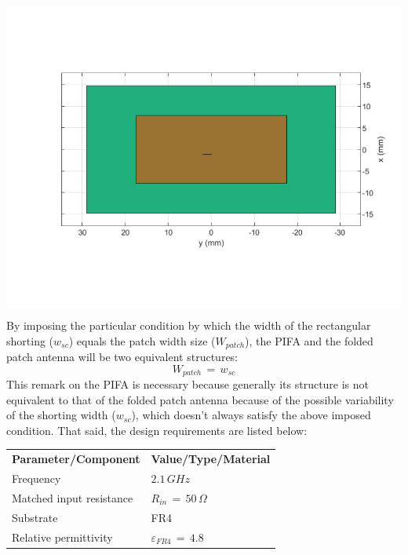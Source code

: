 \documentclass[12pt,a4paper]{article}
\begin{document}
{\begin{center}
\includegraphics[scale=0.35]{patch_structure_3.pdf}
\end{center}
By imposing the particular condition by which the width of the rectangular shorting ($w_{sc}$) equals the patch width size ($W_{patch}$), the PIFA and the folded patch antenna will be two equivalent structures:
\begin{equation}
	W_{patch}\,=\,w_{sc}
\end{equation}
This remark on the PIFA is necessary because generally its structure is not equivalent to that of the folded patch antenna because of the possible variability of the shorting width ($w_{sc}$), which doesn't always satisfy the above imposed condition. That said, the design requirements are listed below: 
	\begin{table}[h]
		\begin{center}
			{\selectfont
\begin{tabular}{||m{5cm}|m{5cm}||}
\hline 
	\rowcolor{lightgray}\multicolumn{2}{|c|}{\textbf{Folded patch design parameters}} 
	\\
	\hline
	\cellcolor{mintbg}\textbf{Parameter/Component} & \cellcolor{mintbg}\textbf{Value/Type/Material}\\
	\hline
	Frequency & $2.1\,GHz$ \\
	\hline
	Matched input resistance & $R_{in}\,=\,50\,\Omega$\\
	\hline
	\cellcolor{pink} Substrate & \cellcolor{pink} FR4 \\
	\hline
    Relative permittivity & $\varepsilon_{FR4}\,=\,4.8$ \\


\end{tabular}}
\end{center}
\end{table}}
\end{document}
